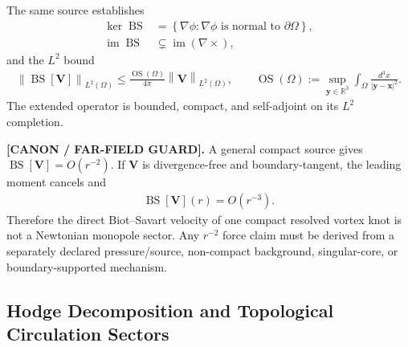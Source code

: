 \documentclass[11pt]{article}
\theoremstyle{definition}
\theoremstyle{plain}
\theoremstyle{remark}
\begin{document}
        The same source establishes
        \begin{align}
            \ker\operatorname{BS}
            &=
            \left\{
            \nabla\phi:
            \nabla\phi\text{ is normal to }\partial\Omega
            \right\},
            \label{eq:canon_biot_savart_kernel}\\
            \operatorname{im}\operatorname{BS}
            &\subsetneq
            \operatorname{im}(\nabla\times),
            \label{eq:canon_biot_savart_image_guard}
        \end{align}
        and the \(L^2\) bound
        \begin{align}
            \left\|\operatorname{BS}[\mathbf V]\right\|_{L^2(\Omega)}
            \leq
            \frac{\operatorname{OS}(\Omega)}{4\pi}
            \left\|\mathbf V\right\|_{L^2(\Omega)},
            \qquad
            \operatorname{OS}(\Omega)
            :=
            \sup_{\mathbf y\in\mathbb R^3}
            \int_\Omega\frac{d^3x}{|\mathbf y-\mathbf x|^2}.
            \label{eq:canon_biot_savart_optical_size_bound}
        \end{align}
        The extended operator is bounded, compact, and self-adjoint on its
        \(L^2\) completion.

        \textbf{[CANON / FAR-FIELD GUARD].}
        A general compact source gives
        \(\operatorname{BS}[\mathbf V]=O(r^{-2})\).  If \(\mathbf V\) is
        divergence-free and boundary-tangent, the leading moment cancels and
        \begin{align}
            \operatorname{BS}[\mathbf V](r)
            =
            O(r^{-3}).
            \label{eq:canon_compact_fluid_knot_far_field}
        \end{align}
        Therefore the direct Biot--Savart velocity of one compact resolved vortex
        knot is not a Newtonian monopole sector.  Any \(r^{-2}\) force claim must be
        derived from a separately declared pressure/source, non-compact background,
        singular-core, or boundary-supported mechanism.

\subsection{Hodge Decomposition and Topological Circulation Sectors}
        \label{subsec:hodge_topological_circulation}
\end{document}
